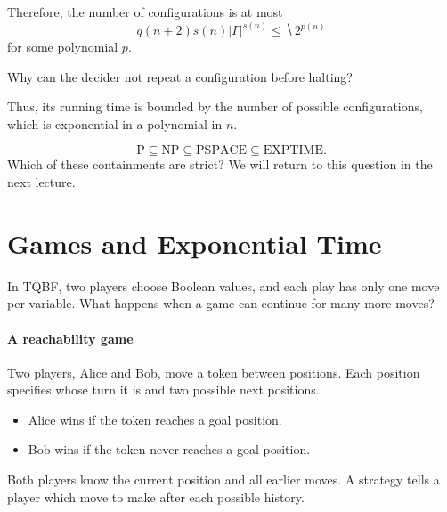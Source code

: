 \documentclass[11  pt]{article}
\begin{document}
Therefore, the number of configurations is at most
\begin{equation*}
    q(n+2)s(n)|\Gamma|^{s(n)}\leq\hide{2^{p(n)}}
\end{equation*}
for some polynomial $p$.

Why can the decider not repeat a configuration before halting?
\vs{1.5cm}

Thus, its running time is bounded by the number of possible configurations, which is exponential in a polynomial in $n$.


\begin{equation*}
    \mathrm{P}\subseteq\mathrm{NP}\subseteq\mathrm{PSPACE}\subseteq\mathrm{EXPTIME}.
\end{equation*}
Which of these containments are strict? We will return to this question in the next lecture.

\newpage
\section{Games and Exponential Time}
In \textsc{TQBF}, two players choose Boolean values, and each play has only one move per variable. What happens when a game can continue for many more moves?

\paragraph{A reachability game}
Two players, Alice and Bob, move a token between positions. Each position specifies whose turn it is and two possible next positions.
\begin{itemize}
    \item Alice wins if the token reaches a goal position.
    \item Bob wins if the token never reaches a goal position.
\end{itemize}
Both players know the current position and all earlier moves. A strategy tells a player which move to make after each possible history.
\end{document}
